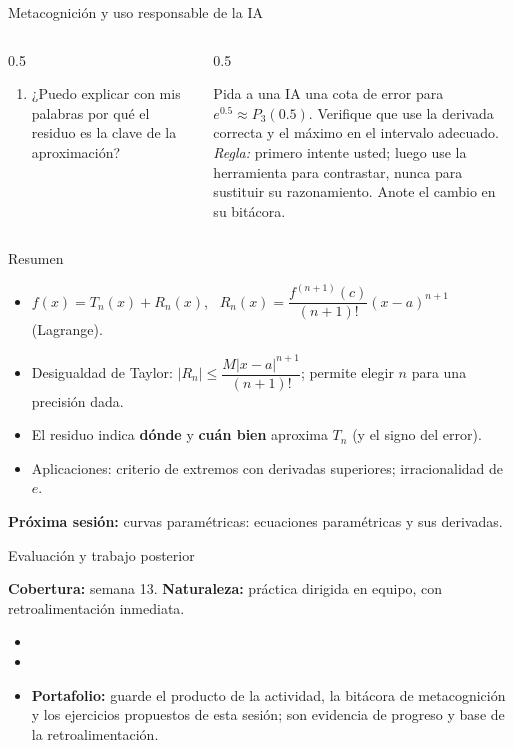 \documentclass[10pt,aspectratio=169]{beamer}
\begin{document}
\begin{frame}{Metacognición y uso responsable de la IA}
  \small
  \begin{columns}[t]
    \begin{column}{0.5\textwidth}
      \begin{metacog}
        \begin{enumerate}
          \metacomun
          \item ¿Puedo explicar con mis palabras por qué el residuo es la clave de la aproximación?
        \end{enumerate}
      \end{metacog}
    \end{column}
    \begin{column}{0.5\textwidth}
      \begin{iabox}
        Pida a una IA una cota de error para $e^{0.5}\approx P_3(0.5)$. Verifique que use la derivada correcta y el máximo en el intervalo adecuado.\\[2pt]
        \textit{Regla:} primero intente usted; luego use la herramienta para contrastar, nunca para sustituir su razonamiento. Anote el cambio en su bitácora.
      \end{iabox}
    \end{column}
  \end{columns}
\end{frame}

\begin{frame}{Resumen}
  \begin{itemize}
    \item $f(x)=T_n(x)+R_n(x)$, \ $R_n(x)=\dfrac{f^{(n+1)}(c)}{(n+1)!}(x-a)^{n+1}$ (Lagrange).
    \item Desigualdad de Taylor: $|R_n|\le\dfrac{M|x-a|^{n+1}}{(n+1)!}$; permite elegir $n$ para una precisión dada.
    \item El residuo indica \textbf{dónde} y \textbf{cuán bien} aproxima $T_n$ (y el signo del error).
    \item Aplicaciones: criterio de extremos con derivadas superiores; irracionalidad de $e$.
  \end{itemize}
  \vspace{3mm}
  \textbf{Próxima sesión:} curvas paramétricas: ecuaciones paramétricas y sus derivadas.
\end{frame}


\begin{frame}{Evaluación y trabajo posterior}
  \small
  \begin{evalbox}
    \textbf{Cobertura:} semana 13. \textbf{Naturaleza:} práctica dirigida en equipo, con retroalimentación inmediata.
  \end{evalbox}
  \begin{itemize}
    \item \criterios
    \item \declaracionia
    \item \textbf{Portafolio:} guarde el producto de la actividad, la bitácora de metacognición y los ejercicios propuestos de esta sesión; son evidencia de progreso y base de la retroalimentación.
  \end{itemize}
\end{frame}
\end{document}

